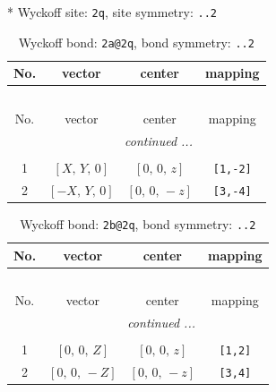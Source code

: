 \documentclass[fleqn,8pt]{jsarticle}
\begin{document}
* Wyckoff site: {\tt 2q}, site symmetry: {\tt ..2}
\renewcommand{\arraystretch}{1.2}
\begin{longtable}{cccc}
\caption{Wyckoff bond: {\tt 2a@2q}, bond symmetry: {\tt ..2}}
 \\
 \hline \hline
No. & vector & center & mapping \\ \hline \endfirsthead

\multicolumn{3}{l}{\tablename\ \thetable{}} \\
 \hline \hline
No. & vector & center & mapping \\ \hline \endhead

 \hline \hline
\multicolumn{3}{r}{\footnotesize\it continued ...} \\ \endfoot

 \hline \hline
\multicolumn{3}{r}{} \\ \endlastfoot

1 & $\left[ X,\, Y,\, 0 \right]$ & $\left[ 0,\, 0,\, z \right]$ & {\tt [1,-2]} \\ \hline
2 & $\left[ - X,\, Y,\, 0 \right]$ & $\left[ 0,\, 0,\, - z \right]$ & {\tt [3,-4]} \\
\end{longtable}
\renewcommand{\arraystretch}{1.2}
\begin{longtable}{cccc}
\caption{Wyckoff bond: {\tt 2b@2q}, bond symmetry: {\tt ..2}}
 \\
 \hline \hline
No. & vector & center & mapping \\ \hline \endfirsthead

\multicolumn{3}{l}{\tablename\ \thetable{}} \\
 \hline \hline
No. & vector & center & mapping \\ \hline \endhead

 \hline \hline
\multicolumn{3}{r}{\footnotesize\it continued ...} \\ \endfoot

 \hline \hline
\multicolumn{3}{r}{} \\ \endlastfoot

1 & $\left[ 0,\, 0,\, Z \right]$ & $\left[ 0,\, 0,\, z \right]$ & {\tt [1,2]} \\ \hline
2 & $\left[ 0,\, 0,\, - Z \right]$ & $\left[ 0,\, 0,\, - z \right]$ & {\tt [3,4]} \\
\end{longtable}
\renewcommand{\arraystretch}{1.2}
\end{document}
